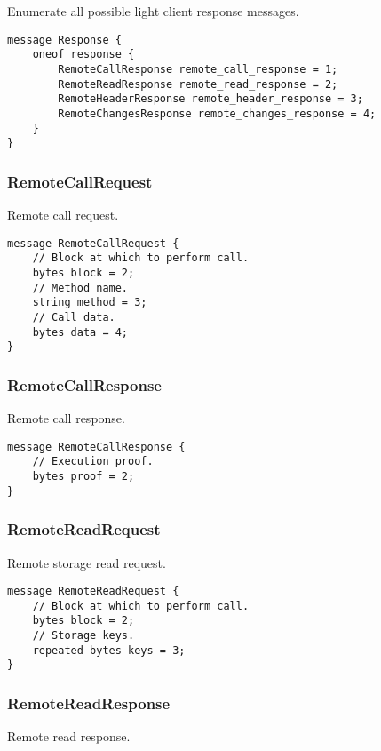 \documentclass{book}
\begin{document}
Enumerate all possible light client response messages.

\begin{lstlisting}[frame=single]
message Response {
    oneof response {
        RemoteCallResponse remote_call_response = 1;
        RemoteReadResponse remote_read_response = 2;
        RemoteHeaderResponse remote_header_response = 3;
        RemoteChangesResponse remote_changes_response = 4;
    }
}
\end{lstlisting}

\subsubsection{RemoteCallRequest}

Remote call request.

\begin{lstlisting}[frame=single]
message RemoteCallRequest {
    // Block at which to perform call.
    bytes block = 2;
    // Method name.
    string method = 3;
    // Call data.
    bytes data = 4;
}
\end{lstlisting}

\subsubsection{RemoteCallResponse}

Remote call response.

\begin{lstlisting}[frame=single]
message RemoteCallResponse {
    // Execution proof.
    bytes proof = 2;
}
\end{lstlisting}

\subsubsection{RemoteReadRequest}

Remote storage read request.

\begin{lstlisting}[frame=single]
message RemoteReadRequest {
    // Block at which to perform call.
    bytes block = 2;
    // Storage keys.
    repeated bytes keys = 3;
}
\end{lstlisting}

\subsubsection{RemoteReadResponse}

Remote read response.
\end{document}
